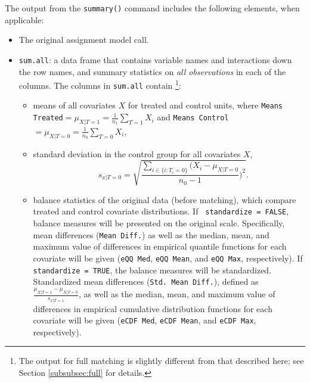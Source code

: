 The output from the \texttt{summary()} command includes the following
elements, when applicable:
\begin{itemize}
\item The original assignment model call.
\item \texttt{sum.all}: a data frame that contains variable names and
  interactions down the row names, and summary statistics on \emph{all
    observations} in each of the columns.  The columns in
  \texttt{sum.all} contain \footnote{The output for full matching is
    slightly different from that described here; see Section
    \ref{subsubsec:full} for details.}:
  \begin{itemize}
  \item means of all covariates $X$ for treated and control units,
    where \texttt{Means Treated}$= \mu_{X|T=1} = \frac{1}{n_1}
    \sum_{T=1} X_i$ and \texttt{Means Control}$= \mu_{X|T=0} =
    \frac{1}{n_0} \sum_{T=0} X_i$,
 \item standard deviation in the control group for all covariates $X$,  
        $$\quad s_{x|T=0} = \sqrt{\frac{\sum_{i \in \{i: T_i=0\}}
        (X_i - \mu_{X|T=0}}{n_0-1})^2 }.$$
  \item balance statistics of the original data (before matching),
    which compare treated and control covariate distributions. If {\tt
      standardize = FALSE}, balance measures will be presented on the
    original scale. Specifically, mean differences (\texttt{Mean
      Diff.}) as well as the median, mean, and maximum value of
    differences in empirical quantile functions for each covariate
    will be given (\texttt{eQQ Med}, \texttt{eQQ Mean}, and
    \texttt{eQQ Max}, respectively). If {\tt standardize = TRUE}, the
    balance measures will be standardized.  Standardized mean
    differences (\texttt{Std. Mean Diff.}), defined as
    $\frac{\mu_{X|T=1} - \mu_{X|T=0}}{s_{x|T=1}}$, as well as the
    median, mean, and maximum value of differences in empirical
    cumulative distribution functions for each covariate will be given
    (\texttt{eCDF Med}, \texttt{eCDF Mean}, and \texttt{eCDF Max},
    respectively).
  \end{itemize}
  

\end{itemize}

